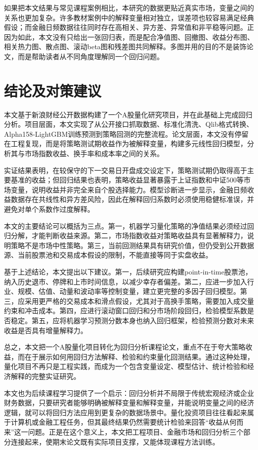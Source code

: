 \documentclass[UTF8,a4paper,12pt]{ctexart}
\begin{document}
如果把本文结果与常见课程案例相比，本研究的数据更贴近真实市场，变量之间的关系也更加复杂。许多教材案例中的解释变量相对独立，误差项也较容易满足经典假设；而金融日频数据往往同时存在高相关、异方差、异常值和非平稳等问题。正因为如此，本文没有只给出一张回归表，而是配合净值图、回撤图、收益分布图、相关热力图、散点图、滚动beta图和残差图共同解释。多图并用的目的不是装饰论文，而是帮助读者从不同角度理解同一个回归问题。

\section{结论及对策建议}
本文基于新浪财经公开数据构建了一个A股量化研究项目，并在此基础上完成回归分析。项目层面，本文实现了从公开接口抓取数据、标准化清洗、Qlib格式转换、Alpha158-LightGBM训练预测到策略回测的完整流程。论文层面，本文没有停留在工程复现，而是将策略测试期收益作为被解释变量，构建多元线性回归模型，分析其与市场指数收益、换手率和成本率之间的关系。

实证结果表明，在较保守的下一交易日开盘成交设定下，策略测试期仍取得高于主要基准的收益；但回归结果也表明，策略收益显著暴露于上证指数和中证500等市场变量，说明收益并非完全来自个股选择能力。模型诊断进一步显示，金融日频收益数据存在共线性和异方差风险，因此在解释回归系数时必须使用稳健标准误，并避免对单个系数作过度解释。

本文的主要结论可以概括为三点。第一，机器学习量化策略的净值结果必须经过回归分解，才能判断收益来源。第二，市场指数收益对策略收益具有显著解释力，说明策略不是市场中性策略。第三，当前回测结果具有研究价值，但仍受到公开数据源、当前股票池和交易成本假设的限制，不能直接等同于实盘收益。

基于上述结论，本文提出以下建议。第一，后续研究应构建point-in-time股票池，纳入历史退市、停牌和上市时间信息，以减少幸存者偏差。第二，应进一步加入行业、规模、估值、动量和波动率等控制变量，建立更完整的多因子回归模型。第三，应采用更严格的交易成本和滑点假设，尤其对于高换手策略，需要加入成交量约束和冲击成本。第四，应进行滚动窗口回归和分市场阶段回归，检验模型系数是否稳定。第五，应将机器学习预测分数本身也纳入回归框架，检验预测分数对未来收益是否具有增量解释力。

总之，本文把一个A股量化项目转化为回归分析课程论文，重点不在于夸大策略收益，而在于展示如何用回归方法解释、检验和约束量化回测结果。通过这种处理，量化项目不再只是工程实践，而成为一个包含变量设定、模型估计、统计检验和经济解释的完整实证研究。

本文也为后续课程学习提供了一个启示：回归分析并不局限于传统宏观经济或企业财务数据，只要研究者能够明确被解释变量和解释变量，并能说明变量之间的经济逻辑，就可以将回归方法应用到更复杂的数据场景中。量化投资项目往往看起来属于计算机或金融工程任务，但其最终结果仍然需要统计检验来回答“收益从何而来”这一问题。正是在这个意义上，本文把工程项目、金融市场和回归分析三个部分连接起来，使期末论文既有实际项目支撑，又能体现课程方法训练。
\end{document}
